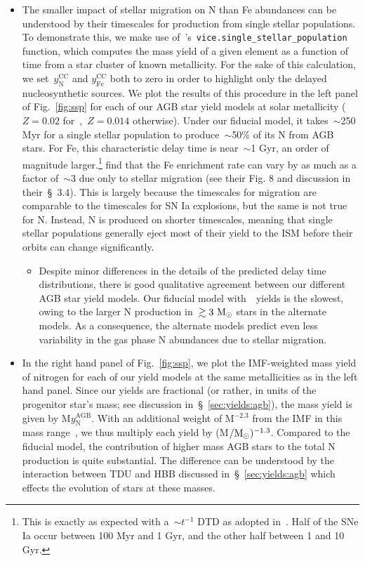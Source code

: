 \documentclass[ms.tex]{subfiles}
\begin{document}
\begin{itemize} 
	\item The smaller impact of stellar migration on N than Fe abundances can 
	be understood by their timescales for production from single stellar 
	populations. 
	To demonstrate this, we make use 
	of~\vice's~\texttt{vice.single\_stellar\_population} function, which 
	computes the mass yield of a given element as a function of time from a 
	star cluster of known metallicity. 
	For the sake of this calculation, we set~$y_\text{N}^\text{CC}$ and 
	$y_\text{Fe}^\text{CC}$ both to zero in order to highlight only the 
	delayed nucleosynthetic sources. 
	We plot the results of this procedure in the left panel of 
	Fig.~\ref{fig:ssp} for each of our AGB star yield models at solar 
	metallicity ($Z = 0.02$ for~\karakasten,~$Z = 0.014$ otherwise). 
	Under our fiducial model, it takes~$\sim$250 Myr for a single stellar 
	population to produce~$\sim$50\% of its N from AGB stars. 
	For Fe, this characteristic delay time is near~$\sim$1 Gyr, an order of 
	magnitude larger.\footnote{
		This is exactly as expected with a~$\sim t^{-1}$ DTD as adopted 
		in~\citet{Johnson2021}. 
		Half of the SNe Ia occur between 100 Myr and 1 Gyr, and the other half 
		between 1 and 10 Gyr. 
	} 
	\citet{Johnson2021} find that the Fe enrichment rate can vary by as much 
	as a factor of~$\sim$3 due only to stellar migration (see their Fig. 8 and 
	discussion in their~\S~3.4). 
	This is largely because the timescales for migration are comparable to the 
	timescales for SN Ia explosions, but the same is not true for N. 
	Instead, N is produced on shorter timescales, meaning that single stellar 
	populations generally eject most of their yield to the ISM before their 
	orbits can change significantly. 
	\begin{itemize} 
		\item Despite minor differences in the details of the predicted delay 
		time distributions, there is good qualitative agreement between our 
		different AGB star yield models. 
		Our fiducial model with~\cristallo~yields is the slowest, owing to the 
		larger N production in~$\gtrsim3\ \text{M}_\odot$ stars in the alternate 
		models. 
		As a consequence, the alternate models predict even less variability 
		in the gas phase N abundances due to stellar migration. 
	\end{itemize} 

	\item In the right hand panel of Fig.~\ref{fig:ssp}, we plot the 
	IMF-weighted mass yield of nitrogen for each of our yield models at the 
	same metallicities as in the left hand panel. 
	Since our yields are fractional (or rather, in units of the progenitor 
	star's mass; see discussion in~\S~\ref{sec:yields:agb}), the mass 
	yield is given by M$y_\text{N}^\text{AGB}$. 
	With an additional weight of M$^{-2.3}$ from the IMF in this mass 
	range~\citep{Kroupa2001}, we thus multiply each yield 
	by (M$/\text{M}_\odot)^{-1.3}$. 
	Compared to the fiducial model, the contribution of higher mass AGB stars 
	to the total N production is quite substantial. 
	The difference can be understood by the interaction between TDU and HBB 
	discussed in~\S~\ref{sec:yields:agb} which effects the evolution 
	of stars at these masses. 


\end{itemize}
\end{document}
